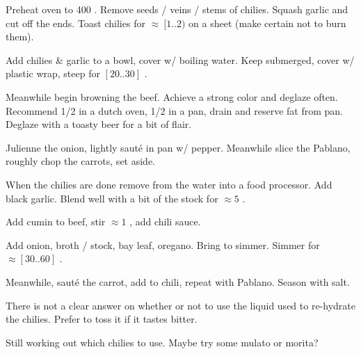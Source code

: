 \begin{preparation}
\item Preheat oven to 400 \Fahrenheit.
    Remove seeds / veins / stems of chilies.
    Squash garlic and cut off the ends.
    Toast chilies for $\approx~[1..2)$ on a sheet (make certain not to burn them).

\item Add chilies \& garlic to a bowl, cover w/ boiling water.
    Keep submerged, cover w/ plastic wrap, steep for $[20..30]$ \minute.

\item Meanwhile begin browning the beef.
    Achieve a strong color and deglaze often.
    Recommend 1/2 in a dutch oven, 1/2 in a pan, drain and reserve fat from pan.
    Deglaze with a toasty beer for a bit of flair.

\item Julienne the onion, lightly saut\'{e} in pan w/ pepper.
    Meanwhile slice the Pablano, roughly chop the carrots, set aside.

\item When the chilies are done remove from the water into a food processor.
    Add black garlic.
    Blend well with a bit of the stock for $\approx5$ \minute.

\item Add cumin to beef, stir $\approx 1$ \minute, add chili sauce.

\item Add onion, broth / stock, bay leaf, oregano.
    Bring to simmer.
    Simmer for $\approx[30..60]$ \minute.

\item Meanwhile, saut\'{e} the carrot, add to chili, repeat with Pablano.
    Season with salt.
\end{preparation}

\begin{variation}
\item There is not a clear answer on whether or not to use the liquid used to
    re-hydrate the chilies.
    Prefer to toss it if it tastes bitter.
\end{variation}

\begin{experiments}
\item Still working out which chilies to use.
    Maybe try some mulato or morita?
\end{experiments}

\recipeend
